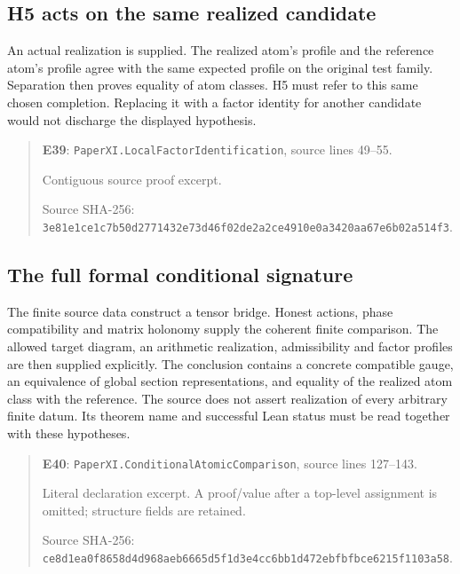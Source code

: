 \documentclass[10pt,oneside]{book}
\begin{document}
\subsection{H5 acts on the same realized candidate}
\label{guide:E39}
An actual realization is supplied. The realized atom's profile and the reference atom's profile agree with the same expected profile on the original test family.
Separation then proves equality of atom classes. H5 must refer to this same chosen completion. Replacing it with a factor identity for another candidate would not discharge the displayed hypothesis.

\begin{quote}\footnotesize\textbf{E39}: \nolinkurl{PaperXI.LocalFactorIdentification}, source lines 49--55.\par Contiguous source proof excerpt.\par Source SHA-256: {\scriptsize\texttt{3e81e1ce1c7b50d2771432e73d46f02de2a2ce4910e0a3420aa67e6b02a514f3}}.\end{quote}


\subsection{The full formal conditional signature}
\label{guide:E40}
The finite source data construct a tensor bridge. Honest actions, phase compatibility and matrix holonomy supply the coherent finite comparison. The allowed target diagram, an arithmetic realization, admissibility and factor profiles are then supplied explicitly.
The conclusion contains a concrete compatible gauge, an equivalence of global section representations, and equality of the realized atom class with the reference. The source does not assert realization of every arbitrary finite datum. Its theorem name and successful Lean status must be read together with these hypotheses.

\begin{quote}\footnotesize\textbf{E40}: \nolinkurl{PaperXI.ConditionalAtomicComparison}, source lines 127--143.\par Literal declaration excerpt. A proof/value after a top-level assignment is omitted; structure fields are retained.\par Source SHA-256: {\scriptsize\texttt{ce8d1ea0f8658d4d968aeb6665d5f1d3e4cc6bb1d472ebfbfbce6215f1103a58}}.\end{quote}
\end{document}
